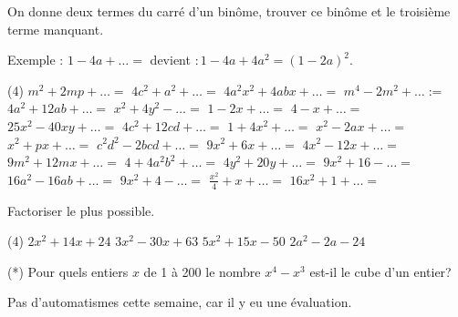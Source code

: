 \documentclass[a4paper,12pt]{report}
\begin{document}
\begin{acti}
On donne deux termes du carré d'un binôme, trouver ce binôme et le troisième terme manquant. 

Exemple : $1-4 a+\ldots=$ devient $: 1-4 a+4 a^2=(1-2 a)^2$.
\begin{tasks}(4)
\task $m^2+2 m p+\ldots=$
\task $4 c^2+a^2+\ldots=$
\task $4 a^2 x^2+4 a b x+\ldots=$
\task $m^4-2 m^2+\ldots:=$
\task $4 a^2+12 a b+\ldots=$
\task $x^2+4 y^2-\ldots=$
\task $1-2 x+\ldots=$
\task $4-x+\ldots=$
\task $25 x^2-40 x y+\ldots=$
\task $4 c^2+12 c d+\ldots=$
\task $1+4 x^2+\ldots=$
\task $x^2-2 a x+\ldots=$
\task $x^2+p x+\ldots=$
\task $c^2 d^2-2 b c d+\ldots=$
\task $9 x^2+6 x+\ldots=$
\task $4 x^2-12 x+\ldots=$
\task $9 m^2+12 m x+\ldots=$
\task $4+4 a^2 b^2+\ldots=$
\task $4 y^2+20 y+\ldots=$
\task $9 x^2+16-\ldots=$
\task $16 a^2-16 a b+\ldots=$
\task $9 x^2+4-\ldots=$
\task $\frac{x^2}{4}+x+\ldots=$
\task $16 x^2+1+\ldots=$
\end{tasks}
\end{acti}
\begin{acti}
Factoriser le plus possible.
	\begin{tasks}(4)
\task $2 x^2+14 x+24$
\task $3 x^2-30 x+63$
\task $5 x^2+15 x-50$
\task $2 a^2-2 a-24$
	\end{tasks}
\end{acti}
\begin{acti}
(*) Pour quels entiers $x$ de 1 à 200 le nombre $x^4-x^3$ est-il le cube d'un entier?
\end{acti}
Pas d'automatismes cette semaine, car il y eu une évaluation.
\end{document}
